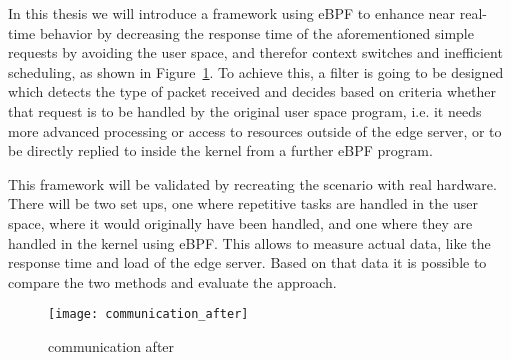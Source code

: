 In this thesis we will introduce a framework using eBPF to enhance near
real-time behavior by decreasing the response time of the aforementioned simple
requests by avoiding the user space, and therefor context switches and
inefficient scheduling, as shown in Figure~\ref{fig:communication_after}. To
achieve this, a filter is going to be designed which detects the type of packet
received and decides based on criteria whether that request is to be handled by
the original user space program, i.e. it needs more advanced processing or
access to resources outside of the edge server, or to be directly replied to
inside the kernel from a further eBPF program.

This framework will be validated by recreating the scenario with real hardware.
There will be two set ups, one where repetitive tasks are handled in the user
space, where it would originally have been handled, and one where they are
handled in the kernel using eBPF. This allows to measure actual data, like the
response time and load of the edge server. Based on that data it is possible to
compare the two methods and evaluate the approach.


\begin{figure}[htpb]
       \centering
       \texttt{[image: communication\_after]}
       \caption{communication after%
       \label{fig:communication_after}}%
\end{figure}
